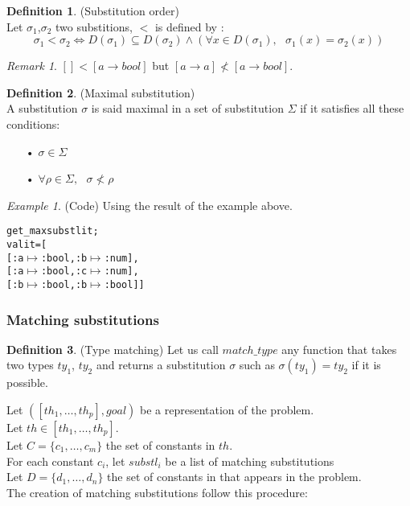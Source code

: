 \documentclass[a4paper, 11pt]{article}
\theoremstyle{plain}
\theoremstyle{definition}
\newtheorem*{mydef}{Definition}
\theoremstyle{remark}
\newtheorem*{remark}{Remark}
\newtheorem*{example}{Example}
\begin{document}
\begin{mydef} (Substitution order)    
\\Let $\sigma_1$,$\sigma_2$ two substitions, $<$ is defined by :
  \[\sigma_1 < \sigma_2 \iff D(\sigma_1) \subseteq D(\sigma_2) \wedge
  (\forall x \in D(\sigma_1),\mbox{ } \sigma_1(x) = \sigma_2(x))\]
\end{mydef}  
 
\begin{remark} $[] < [a \rightarrow bool]$ but $[a \rightarrow a] \not < [a \rightarrow bool]$.
\end{remark} 
 
\begin{mydef} (Maximal substitution)  
\\A substitution $\sigma$ is said maximal in a set of substitution $\Sigma$ if it satisfies all these conditions:
\begin{enumerate}
 \item[•] $\sigma \in \Sigma$ 
 \item[•] $\forall \rho \in \Sigma,\mbox{ } \sigma \not < \rho$ 
\end{enumerate} 
\end{mydef} 

\begin{example} (Code)
Using the result of the example above.
\begin{alltt}
get_maxsubstl it;
val it = [
 [{:a \(\mapsto\) :bool}, {:b \(\mapsto\) :num}],
 [{:a \(\mapsto\) :bool}, {:c \(\mapsto\) :num}],
 [{:b \(\mapsto\) :bool},{:b \(\mapsto\) :bool}]]
\end{alltt} 
\end{example}  

\subsubsection{Matching substitutions}  
  
\begin{mydef} (Type matching)
  Let us call $match\_type$ any function that takes two types $ty_1$, $ty_2$ and returns a substitution $\sigma$ such as $\sigma (ty_1) = ty_2$ if it is possible. 
\end{mydef}

\noindent Let $([th_1,\ldots,th_p],goal)$ be a representation of the problem.
\\Let $th \in [th_1,\ldots,th_p]$.
\\Let $C =\lbrace c_1,\ldots,c_m \rbrace$ the set of constants in   
$th$.
\\For each constant $c_i$, let $substl_i$ be a list of matching substitutions 
\\Let $D = \lbrace d_1,\ldots,d_n \rbrace$ the set of constants in   
that appears in the problem.
\\The creation of matching substitutions follow this procedure:
\end{document}
